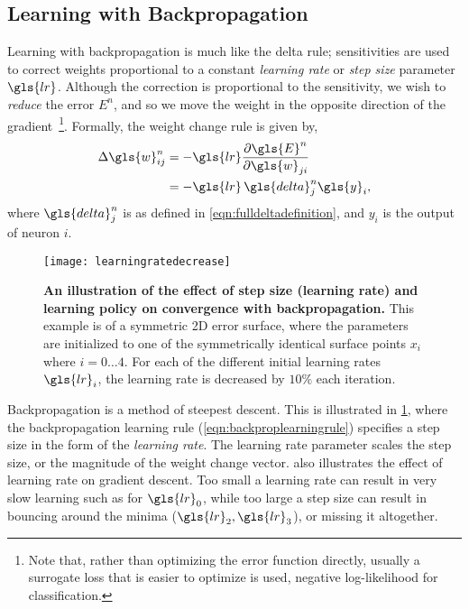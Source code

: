 \documentclass[thesis]{subfiles}
\begin{document}
\subsection{Learning with Backpropagation}
Learning with backpropagation is much like the delta rule; sensitivities are used to correct weights proportional to a constant \emph{learning rate} or \emph{step size} parameter $\gls{lr}$. Although the correction is proportional to the sensitivity, we wish to \emph{reduce} the error $E^n$, and so we move the weight in the opposite direction of the gradient~\footnote{Note that, rather than optimizing the error function directly, usually a surrogate loss that is easier to optimize is used, \ie negative log-likelihood for classification.}. Formally, the weight change rule is given by,
\begin{equation}
\begin{aligned}
    \Delta \gls{w}^n_{ij} &= -\gls{lr} \frac{\partial \gls{E}^n}{\partial \gls{w}_{ji}}\\
    &= -\gls{lr} \, \gls{delta}^n_j \gls{y}_i,
     \label{eqn:backproplearningrule}
\end{aligned}
\end{equation}
where $\gls{delta}^n_j$ is as defined in \cref{eqn:fulldeltadefinition}, and $y_i$ is the output of neuron $i$.
%
\begin{figure}[tbp]
\centering
\texttt{[image: learningratedecrease]}
\caption[Learning rate and convergence]{\textbf{An illustration of the effect of step size (learning rate) and learning policy on convergence with backpropagation.} This example is of a symmetric 2D error surface, where the parameters are initialized to one of the symmetrically identical surface points $x_i$ where $i=0\ldots4$. For each of the different initial learning rates $\gls{lr}_i$, the learning rate is decreased by $10\%$ each iteration.}\label{fig:learningrate}
\end{figure}
Backpropagation is a method of steepest descent. This is illustrated in \cref{fig:learningrate}, where the backpropagation learning rule (\cref{eqn:backproplearningrule}) specifies a step size in the form of the \emph{learning rate}. The learning rate parameter scales the step size, or the magnitude of the weight change vector.  also illustrates the effect of learning rate on gradient descent. Too small a learning rate can result in very slow learning such as for $\gls{lr}_0$, while too large a step size can result in bouncing around the minima ($\gls{lr}_2, \gls{lr}_3$), or missing it altogether. 
\end{document}
